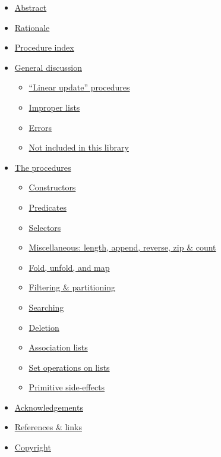 \begin{itemize}
\tightlist
\item
  \protect\hyperlink{Abstract}{Abstract}
\item
  \protect\hyperlink{Rationale}{Rationale}
\item
  \protect\hyperlink{ProcedureIndex}{Procedure index}
\item
  \protect\hyperlink{GeneralDiscussion}{General discussion}

  \begin{itemize}
  \tightlist
  \item
    \protect\hyperlink{LinearUpdateProcedures}{``Linear update''
    procedures}
  \item
    \protect\hyperlink{ImproperLists}{Improper lists}
  \item
    \protect\hyperlink{Errors}{Errors}
  \item
    \protect\hyperlink{NotIncludedInThisLibrary}{Not included in this
    library}
  \end{itemize}
\item
  \protect\hyperlink{TheProcedures}{The procedures}

  \begin{itemize}
  \tightlist
  \item
    \protect\hyperlink{Constructors}{Constructors}
  \item
    \protect\hyperlink{Predicates}{Predicates}
  \item
    \protect\hyperlink{Selectors}{Selectors}
  \item
    \protect\hyperlink{Miscellaneous}{Miscellaneous: length, append,
    reverse, zip \& count}
  \item
    \protect\hyperlink{FoldUnfoldMap}{Fold, unfold, and map}
  \item
    \protect\hyperlink{FilteringPartitioning}{Filtering \& partitioning}
  \item
    \protect\hyperlink{Searching}{Searching}
  \item
    \protect\hyperlink{Deletion}{Deletion}
  \item
    \protect\hyperlink{AssociationLists}{Association lists}
  \item
    \protect\hyperlink{SetOperationsOnLists}{Set operations on lists}
  \item
    \protect\hyperlink{PrimitiveSideEffects}{Primitive side-effects}
  \end{itemize}
\item
  \protect\hyperlink{Acknowledgements}{Acknowledgements}
\item
  \protect\hyperlink{ReferencesLinks}{References \& links}
\item
  \protect\hyperlink{Copyright}{Copyright}
\end{itemize}

